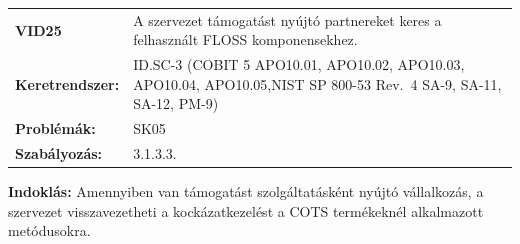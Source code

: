 \documentclass[12pt,magyar,a4paper,oneside]{scrreprt}
\begin{document}
\begin{longtable}[]{@{}ll@{}}
\toprule
\endhead
\begin{minipage}[t]{0.16\columnwidth}\raggedright
\textbf{VID25}\strut
\end{minipage} & \begin{minipage}[t]{0.79\columnwidth}\raggedright
A szervezet támogatást nyújtó partnereket keres a felhasznált FLOSS
komponensekhez.\strut
\end{minipage}\tabularnewline
\begin{minipage}[t]{0.16\columnwidth}\raggedright
\textbf{Keretrendszer:}\strut
\end{minipage} & \begin{minipage}[t]{0.79\columnwidth}\raggedright
ID.SC-3 (COBIT 5 APO10.01, APO10.02, APO10.03, APO10.04, APO10.05,NIST
SP 800-53 Rev.~4 SA-9, SA-11, SA-12, PM-9)\strut
\end{minipage}\tabularnewline
\begin{minipage}[t]{0.16\columnwidth}\raggedright
\textbf{Problémák:}\strut
\end{minipage} & \begin{minipage}[t]{0.79\columnwidth}\raggedright
SK05\strut
\end{minipage}\tabularnewline
\begin{minipage}[t]{0.16\columnwidth}\raggedright
\textbf{Szabályozás:}\strut
\end{minipage} & \begin{minipage}[t]{0.79\columnwidth}\raggedright
3.1.3.3.\strut
\end{minipage}\tabularnewline
\bottomrule
\end{longtable}

\textbf{Indoklás: } Amennyiben van támogatást szolgáltatásként nyújtó
vállalkozás, a szervezet visszavezetheti a kockázatkezelést a COTS
termékeknél alkalmazott metódusokra.
\end{document}

